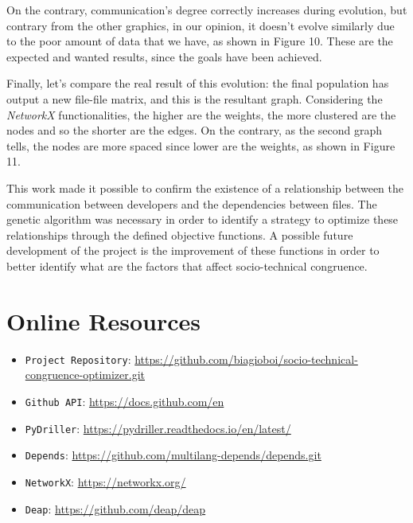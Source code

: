 \documentclass[sigconf]{acmart}
\begin{document}
On the contrary, communication’s degree correctly increases during evolution, but contrary from the other graphics, in our opinion, it doesn’t evolve similarly due to the poor amount of data that we have, as shown in Figure 10.
These are the expected and wanted results, since the goals have been achieved.

Finally, let’s compare the real result of this evolution: the final population has output a new file-file matrix, and this is the resultant graph. Considering the {\itshape NetworkX} functionalities, the higher are the weights, the more clustered are the nodes and so the shorter are the edges. On the contrary, as the second graph tells, the nodes are more spaced since lower are the weights, as shown in Figure 11.

This work made it possible to confirm the existence of a relationship between the communication between developers and the dependencies between files. The genetic algorithm was necessary in order to identify a strategy to optimize these relationships through the defined objective functions.
A possible future development of the project is the improvement of these functions in order to better identify what are the factors that affect socio-technical congruence.





\appendix
\section{Online Resources}

\begin{itemize}
\item {\verb|Project Repository|}: \url{https://github.com/biagioboi/socio-technical-congruence-optimizer.git}
\item {\verb|Github API|}: \url{https://docs.github.com/en}
\item {\verb|PyDriller|}: \url{https://pydriller.readthedocs.io/en/latest/}
\item {\verb|Depends|}: \url{https://github.com/multilang-depends/depends.git}
\item {\verb|NetworkX|}: \url{https://networkx.org/}
\item {\verb|Deap|}: \url{https://github.com/deap/deap}
\end{itemize}
\end{document}
